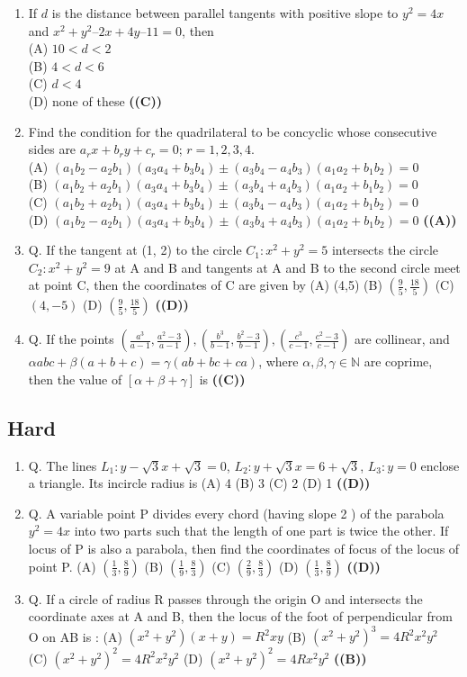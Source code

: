 \documentclass{article}
\begin{document}
\begin{enumerate}
\item If $d$ is the distance between parallel tangents with positive slope to $y^2 = 4x$ and $x^2 + y^2 – 2x + 4y – 11 = 0$, then\\
(A) $10 < d < 2$\\
(B) $4 < d < 6$\\
(C) $d < 4$\\
(D) none of these \hfill \textbf{((C))}
\item Find the condition for the quadrilateral to be concyclic whose consecutive sides are $a_rx + b_ry + c_r = 0$; $r = 1, 2, 3, 4.$\\
(A) $(a_1b_2-a_2b_1) (a_3a_4 + b_3b_4) \pm (a_3b_4 - a_4b_3) (a_1a_2 + b_1b_2) = 0$\\
(B) $(a_1b_2 + a_2b_1) (a_3a_4 + b_3b_4) \pm (a_3b_4 + a_4b_3) (a_1a_2 + b_1b_2) = 0$\\
(C) $(a_1b_2 + a_2b_1) (a_3a_4 + b_3b_4) \pm (a_3b_4 - a_4b_3) (a_1a_2 + b_1b_2) = 0$\\
(D) $(a_1b_2 - a_2b_1) (a_3a_4 + b_3b_4) \pm (a_3b_4 + a_4b_3) (a_1a_2 + b_1b_2) = 0$ \hfill \textbf{((A))}
\item Q. If the tangent at (1, 2) to the circle $C_1 : x^2+y^2 = 5$ intersects the circle $C_2 : x^2+y^2 = 9$ at A and B and tangents at A and B to the second circle meet at point C, then the coordinates of C are given by
(A) (4,5)
(B) $(\frac{9}{5}, \frac{18}{5})$
(C) $(4, -5)$
(D) $(\frac{9}{5}, \frac{18}{5})$ \hfill \textbf{((D))}
\item Q. If the points $\left(\frac{a^3}{a-1}, \frac{a^2-3}{a-1}\right), \left(\frac{b^3}{b-1}, \frac{b^2-3}{b-1}\right), \left(\frac{c^3}{c-1}, \frac{c^2-3}{c-1}\right)$ are collinear, and $\alpha abc + \beta (a + b + c) = \gamma (ab + bc + ca)$, where $\alpha, \beta, \gamma \in \mathbb{N}$ are coprime, then the value of $[\alpha + \beta + \gamma]$ is \hfill \textbf{((C))}
\end{enumerate}
\subsection{Hard}
\begin{enumerate}
\item Q. The lines $L_1 : y - \sqrt{3}x + \sqrt{3} = 0$, $L_2 : y + \sqrt{3}x = 6 + \sqrt{3}$, $L_3 : y = 0$ enclose a triangle. Its incircle radius is
(A) 4
(B) 3
(C) 2
(D) 1 \hfill \textbf{((D))}
\item Q. A variable point P divides every chord (having slope 2 ) of the parabola $y^2 = 4x$ into two parts such that the length of one part is twice the other. If locus of P is also a parabola, then find the coordinates of focus of the locus of point P.
(A) $\left(\frac{1}{3}, \frac{8}{9}\right)$
(B) $\left(\frac{1}{9}, \frac{8}{3}\right)$
(C) $\left(\frac{2}{9}, \frac{8}{3}\right)$
(D) $\left(\frac{1}{3}, \frac{8}{9}\right)$ \hfill \textbf{((D))}
\item Q. If a circle of radius R passes through the origin O and intersects the coordinate axes at A and B, then the locus of the foot of perpendicular from O on AB is :
(A) $(x^2 + y^2) (x + y) = R^2xy$
(B) $(x^2 + y^2)^3 = 4R^2x^2y^2$
(C) $(x^2 + y^2)^2 = 4R^2x^2y^2$
(D) $(x^2 + y^2)^2 = 4Rx^2y^2$ \hfill \textbf{((B))}
\end{enumerate}
\end{document}
